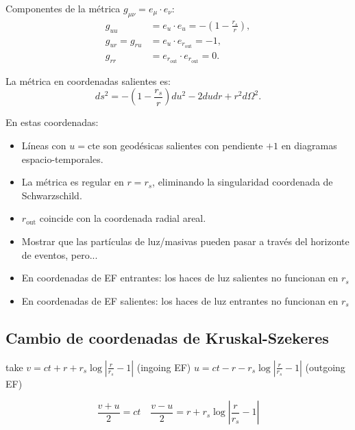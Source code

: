 Componentes de la métrica \( g_{\mu\nu} = e_\mu \cdot e_\nu \):
\begin{equation}
    \begin{aligned}
        g_{uu}          & = e_u \cdot e_u = -\left(1 - \frac{r_s}{r}\right), \\
        g_{ur} = g_{ru} & = e_u \cdot e_{r_{\text{out}}} = -1,               \\
        g_{rr}          & = e_{r_{\text{out}}} \cdot e_{r_{\text{out}}} = 0.
    \end{aligned}
\end{equation}

La métrica en coordenadas salientes es:
\begin{equation}
    ds^2 = -\left(1 - \frac{r_s}{r}\right) du^2 - 2 du dr + r^2 d\Omega^2.
\end{equation}


En estas coordenadas:
\begin{itemize}
    \item Líneas con \( u = \text{cte} \) son geodésicas salientes con pendiente \( +1 \) en diagramas espacio-temporales.
    \item La métrica es regular en \( r = r_s \), eliminando la singularidad coordenada de Schwarzschild.
    \item \( r_{\text{out}} \) coincide con la coordenada radial areal.
\end{itemize}
\begin{itemize}
    \item Mostrar que las partículas de luz/masivas pueden pasar a través del horizonte de eventos, pero...
    \item En coordenadas de EF entrantes: los haces de luz salientes no funcionan en $r_s$
    \item En coordenadas de EF salientes: los haces de luz entrantes no funcionan en $r_s$
\end{itemize}

\subsection{Cambio de coordenadas de Kruskal-Szekeres}

take
$v=c t+r+r_s \log \left|\frac{r}{r_s}-1\right|$ (ingoing EF) $u=c t-r-r_s \log \left|\frac{r}{r_s}-1\right|$ (outgoing EF)


\begin{equation}
    \frac{v+u}{2}=c t \quad \frac{v-u}{2}=r+r_s \log \left|\frac{r}{r_s}-1\right|
\end{equation}

